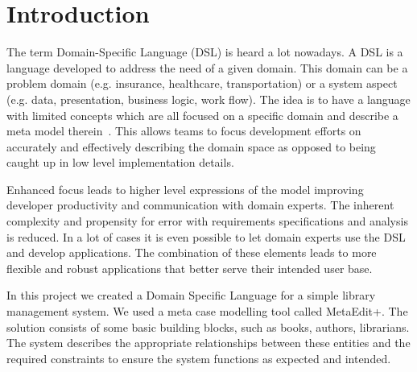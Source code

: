 \section{Introduction}
The term Domain-Specific Language (DSL) is heard a lot nowadays. A DSL is a language developed to address the need of a given domain. This domain can be a problem domain (e.g. insurance, healthcare, transportation) or a system aspect (e.g. data, presentation, business logic, work flow).
The idea is to have a language with limited concepts which are all focused on a specific domain and describe a meta model therein~\cite{karsai2014design}.
This allows teams to focus development efforts on accurately and effectively describing the domain space as opposed to being caught up in low level implementation details.\par
Enhanced focus leads to higher level expressions of the model improving developer productivity and communication with domain experts. The inherent complexity and propensity for error with requirements specifications and analysis is reduced.
In a lot of cases it is even possible to let domain experts use the DSL and develop applications. The combination of these elements leads to more flexible and robust applications that better serve their intended user base.

In this project we created a Domain Specific Language for a simple library management system. We used a meta case modelling tool called MetaEdit+.  The solution consists of some basic building blocks, such as books, authors, librarians. The system describes the appropriate relationships between these entities and the required constraints to ensure the system functions as expected and intended.